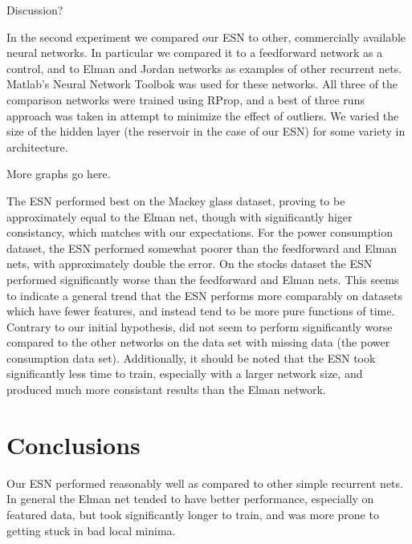 \documentclass{acm_proc_article-sp}
\begin{document}
Discussion?

In the second experiment we compared our ESN to other, commercially available neural networks. In particular we compared it to a feedforward network as a control, and to Elman and Jordan networks as examples of other recurrent nets. Matlab's Neural Network Toolbok was used for these networks. All three of the comparison networks were trained using RProp, and a best of three runs approach was taken in attempt to minimize the effect of outliers. We varied the size of the hidden layer (the reservoir in the case of our ESN) for some variety in architecture.

More graphs go here.

The ESN performed best on the Mackey glass dataset, proving to be approximately equal to the Elman net, though with significantly higer consistancy, which matches with our expectations. For the power consumption dataset, the ESN performed somewhat poorer than the feedforward and Elman nets, with approximately double the error. On the stocks dataset the ESN performed significantly worse than the feedforward and Elman nets. This seems to indicate a general trend that the ESN performs more comparably on datasets which have fewer features, and instead tend to be more pure functions of time. Contrary to our initial hypothesis, did not seem to perform significantly worse compared to the other networks on the data set with missing data (the power consumption data set). Additionally, it should be noted that the ESN took significantly less time to train, especially with a larger network size, and produced much more consistant results than the Elman network.

\section{Conclusions}
Our ESN performed reasonably well as compared to other simple recurrent nets. In general the Elman net tended to have better performance, especially on featured data, but took significantly longer to train, and was more prone to getting stuck in bad local minima.
\end{document}
